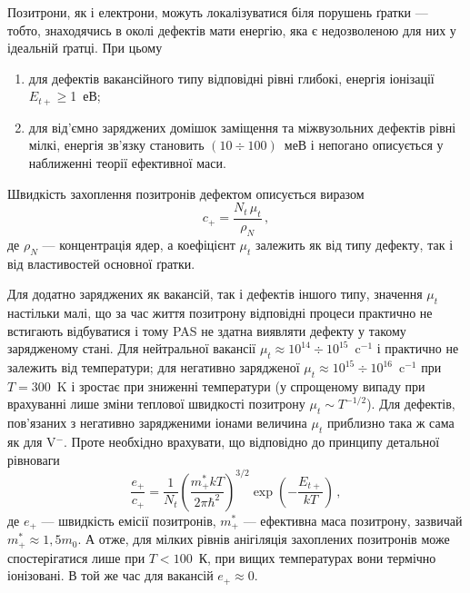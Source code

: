 Позитрони, як і електрони, можуть локалізуватися біля порушень ґратки --- тобто, знаходячись в околі дефектів мати енергію,
яка є недозволеною для них у ідеальній ґратці.
При цьому
\begin{enumerate}[label=\asbuk*),leftmargin=0em,itemindent=1.5em]
\item для дефектів вакансійного типу відповідні рівні глибокі, енергія іонізації $E_{t+}\geq$1~еВ;
\item для від'ємно заряджених домішок заміщення та міжвузольних дефектів рівні мілкі,
 енергія зв'язку становить $(10\div100)$~меВ і
непогано описується у наближенні теорії ефективної маси.
\end{enumerate}

Швидкість захоплення позитронів дефектом описується виразом
\begin{equation}\label{PASc}
c_+=\frac{N_t\,\mu_t}{\rho_N}\,,
\end{equation}
де
$\rho_N$ --- концентрація ядер,
а коефіцієнт $\mu_t$ залежить як від типу дефекту, так і від властивостей основної ґратки.

Для додатно заряджених як вакансій, так і дефектів іншого типу, значення $\mu_t$
настільки малі, що за час життя позитрону відповідні процеси практично не встигають відбуватися і тому
PAS не здатна виявляти дефекту у такому зарядженому стані.
Для нейтральної вакансії $\mu_t\approx10^{14}\div10^{15}$~c$^{-1}$ і практично не залежить від температури;
для негативно зарядженої $\mu_t\approx10^{15}\div10^{16}$~c$^{-1}$ при $T=300$~K і зростає при
зниженні температури (у спрощеному випаду при врахуванні лише зміни теплової швидкості
позитрону $\mu_t\sim T^{-1/2}$).
Для дефектів, пов'язаних з негативно зарядженими іонами величина $\mu_t$ приблизно така ж сама
як для V$^-$.
Проте необхідно врахувати, що відповідно до принципу детальної рівноваги
\begin{equation}\label{PASce}
\frac{e_+}{c_+}=\frac{1}{N_t}\left(\frac{m_+^*kT}{2\pi\hbar^2}\right)^{3/2}\exp\left(-\frac{E_{t+}}{kT}\right)\,,
\end{equation}
де
$e_+$ --- швидкість емісії позитронів,
$m_+^*$ --- ефективна маса позитрону, зазвичай $m_+^*\approx1,5 m_0$.
А отже, для мілких рівнів анігіляція захоплених позитронів може спостерігатися лише при
$T<100$~К, при вищих температурах вони термічно іонізовані.
В той же час для вакансій $e_+\approx0$.

